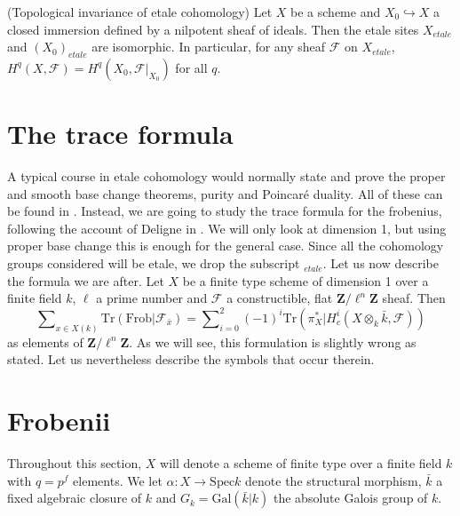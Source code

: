 \begin{proposition}
\label{proposition-topological-invariance}
(Topological invariance of etale cohomology)
Let $X$ be a scheme and $X_0\hookrightarrow X$ a closed immersion defined by a
nilpotent sheaf of ideals. Then the etale sites $X_{etale}$ and $(X_0)_{etale}$ 
are
isomorphic. In particular, for any sheaf $\mathcal{F}$ on $X_{etale}$, $H^q(X,
\mathcal{F}) = H^q(X_0, \mathcal{F}|_{X_0})$ for all $q$.
\end{proposition}




\section{The trace formula}
\label{section-trace-formula}

\noindent
A typical course in etale cohomology would normally state and prove the
proper and smooth base change theorems, purity and Poincar\'e duality. All of
these can be found in \cite[Arcata]{SGA4.5}. Instead, we are going to study the
trace formula for the frobenius, following the account of Deligne in
\cite[Rapport]{SGA4.5}. We will only look at dimension 1, but using proper base
change this is enough for the general case. Since all the cohomology groups
considered will be etale, we drop the subscript $_{etale}$. Let us now describe
the formula we are after. Let $X$ be a finite type scheme of dimension 1 over a
finite field $k$, $\ell$ a prime number and $\mathcal{F}$ a constructible, flat
$\mathbf{Z}/\ell^n\mathbf{Z}$ sheaf. Then
\begin{equation}
\label{equation-trace-formula-initial}
\sum\nolimits_{x \in X(k)}
\text{Tr}(\text{Frob} | \mathcal{F}_{\bar x}) =
\sum\nolimits_{i=0}^2
(-1)^i \text{Tr}(\pi_X^* | H^i_c(X\otimes_k \bar k, \mathcal{F}))
\end{equation}
as elements of $\mathbf{Z}/\ell^n\mathbf{Z}$. As we will see, this formulation
is slightly wrong as stated. Let us nevertheless describe the symbols that
occur therein.




\section{Frobenii}
\label{section-frobenii}

\noindent
Throughout this section, $X$ will denote a scheme of finite type over a finite
field $k$ with $q = p^f$ elements. We let $\alpha : X \to \text{Spec} k$ denote
the structural morphism, $\bar k$ a fixed algebraic closure of $k$ and $G_k =
\text{Gal}(\bar k | k)$ the absolute Galois group of $k$.


